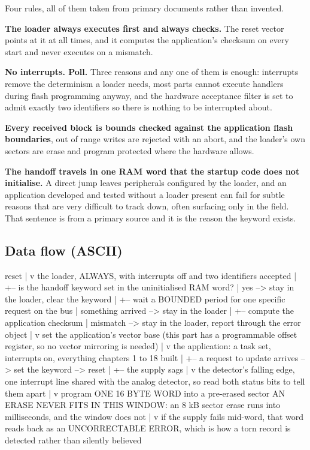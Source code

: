 Four rules, all of them taken from primary documents rather than invented.

\textbf{The loader always executes first and always checks.} The reset vector
points at it at all times, and it computes the application's checksum on every
start and never executes on a mismatch.

\textbf{No interrupts. Poll.} Three reasons and any one of them is enough:
interrupts remove the determinism a loader needs, most parts cannot execute
handlers during flash programming anyway, and the hardware acceptance filter is
set to admit exactly two identifiers so there is nothing to be interrupted
about.

\textbf{Every received block is bounds checked against the application flash
boundaries}, out of range writes are rejected with an abort, and the loader's own
sectors are erase and program protected where the hardware allows.

\textbf{The handoff travels in one RAM word that the startup code does not
initialise.} A direct jump leaves peripherals configured by the loader, and an
application developed and tested without a loader present can fail for subtle
reasons that are very difficult to track down, often surfacing only in the
field. That sentence is from a primary source and it is the reason the keyword
exists.

\subsection*{Data flow (ASCII)}

\begin{asciiart}
  reset
    |
    v
  the loader, ALWAYS, with interrupts off and two identifiers accepted
    |
    +-- is the handoff keyword set in the uninitialised RAM word?
    |        yes --> stay in the loader, clear the keyword
    |
    +-- wait a BOUNDED period for one specific request on the bus
    |        something arrived --> stay in the loader
    |
    +-- compute the application checksum
    |        mismatch --> stay in the loader, report through the error object
    |
    v
  set the application's vector base (this part has a programmable offset
  register, so no vector mirroring is needed)
    |
    v
  the application: a task set, interrupts on, everything chapters 1 to 18 built
    |
    +-- a request to update arrives --> set the keyword --> reset
    |
    +-- the supply sags
             |
             v
       the detector's falling edge, one interrupt line shared with the
       analog detector, so read both status bits to tell them apart
             |
             v
       program ONE 16 BYTE WORD into a pre-erased sector
       AN ERASE NEVER FITS IN THIS WINDOW: an 8 kB sector erase runs into
       milliseconds, and the window does not
             |
             v
       if the supply fails mid-word, that word reads back as an
       UNCORRECTABLE ERROR, which is how a torn record is detected rather
       than silently believed
\end{asciiart}

